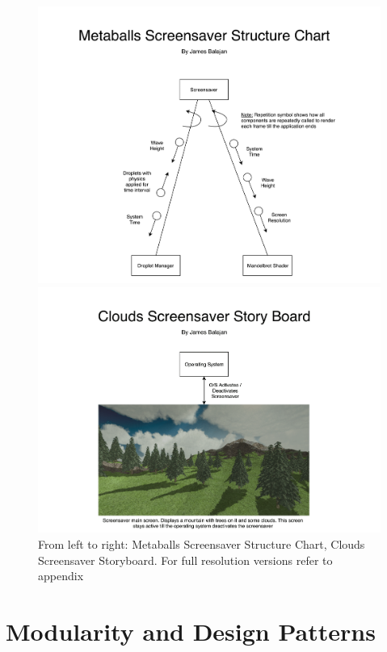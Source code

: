 \documentclass[10pt, openany]{book}
\begin{document}
\begin{figure}[H]
	\centering
	\begin{minipage}{.5\textwidth}
  		\centering
  		\includegraphics[width=.8\linewidth]{Metaballs Screensaver Structure Chart}  
	\end{minipage}%
	\begin{minipage}{.5\textwidth}
  		\centering
  		\includegraphics[width=.8\linewidth]{Clouds Screensaver Storyboard} 
	\end{minipage}
	\caption{From left to right: Metaballs Screensaver Structure Chart, Clouds Screensaver Storyboard. For full resolution versions refer to appendix}
\end{figure}

\section{Modularity and Design Patterns}
\end{document}
